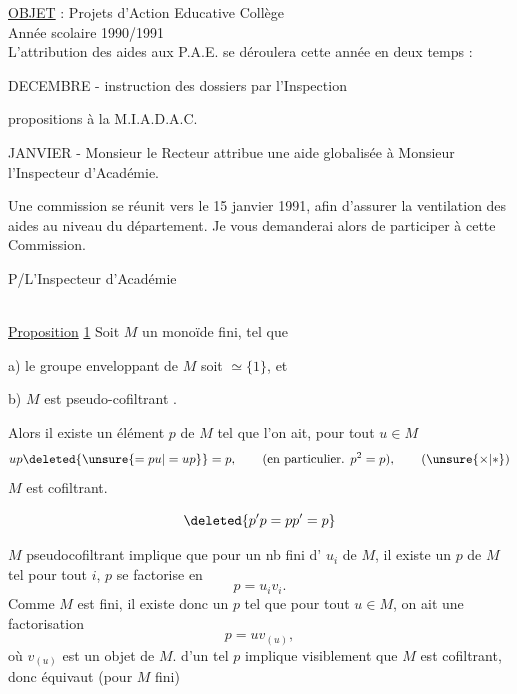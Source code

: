 \uline{OBJET} : Projets d'Action Educative Collège \\
Année scolaire 1990/1991\\

L'attribution des aides aux P.A.E. se déroulera cette année en deux temps :

DECEMBRE \quad - instruction des dossiers par l'Inspection 

propositions à la M.I.A.D.A.C.

JANVIER \quad - Monsieur le Recteur attribue une aide globalisée à Monsieur l'Inspecteur d'Académie.

Une commission se réunit vers le 15 janvier 1991, afin d'assurer la ventilation des aides au niveau du département. Je vous demanderai alors de participer à cette Commission.

P/L'Inspecteur d'Académie\\
\\



\uline{Proposition} \uline{1} Soit $M$ un monoïde fini, tel que

a) le groupe enveloppant de $M$ soit $\simeq\{1\}$, et

b) $M$ est pseudo-cofiltrant .

Alors il existe un  élément $p$ de $M$ tel
que l'on ait, pour tout $u\in M$
\[
up\deleted{\unsure{=pu|=up}}=p,\qquad(\text{en particulier. }p^2=p),\tag*{$(\unsure{\times|*})$}
\]
  $M$ est  cofiltrant.

\[
\deleted{p'p=pp'=p}
\]

 $M$ pseudocofiltrant 
implique que pour un nb fini d'
$u_i$ de $M$, il existe un  $p$ de $M$ tel
  pour tout $i$, $p$ se factorise en
\[
p=u_i v_i.
\]
Comme $M$ est fini, il existe donc un $p$
tel que pour tout $u\in M$, on ait une
factorisation
\[
p=uv_{(u)},\tag*{$(\times\times)$}
\]
où $v_{(u)}$ est un objet de $M$.  
d'un tel $p$ implique visiblement que $M$
est cofiltrant, donc équivaut (pour $M$ fini)

